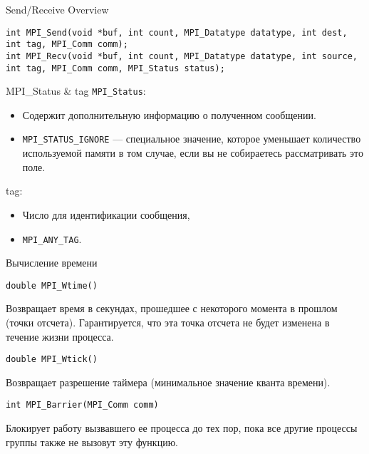 \begin{frame}[fragile]{Send/Receive Overview}
\begin{lstlisting}
int MPI_Send(void *buf, int count, MPI_Datatype datatype, int dest, int tag, MPI_Comm comm);
int MPI_Recv(void *buf, int count, MPI_Datatype datatype, int source, int tag, MPI_Comm comm, MPI_Status status);
\end{lstlisting}
\end{frame}

\begin{frame}{MPI_Status \& tag}
\texttt{MPI_Status}:

\begin{itemize}
    \item Содержит дополнительную информацию о полученном сообщении.
    \item \texttt{MPI_STATUS_IGNORE} --- специальное значение, которое уменьшает количество используемой памяти в том случае, если вы не собираетесь рассматривать это поле.
\end{itemize}
\vfill
tag:
\begin{itemize}
    \item Число для идентификации сообщения,
    \item \texttt{MPI_ANY_TAG}.
\end{itemize}
\end{frame}

\begin{frame}[fragile]{Вычисление времени}

\begin{lstlisting}
double MPI_Wtime()
\end{lstlisting}

Возвращает время в секундах, прошедшее с  некоторого момента в прошлом (точки отсчета). Гарантируется, что эта точка отсчета не будет изменена в течение жизни процесса.

\begin{lstlisting}
double MPI_Wtick()
\end{lstlisting}

Возвращает разрешение таймера (минимальное значение кванта времени).

\begin{lstlisting}
int MPI_Barrier(MPI_Comm comm)
\end{lstlisting}

Блокирует работу вызвавшего ее процесса до тех пор, пока все другие процессы группы также не вызовут эту функцию.

\end{frame}


